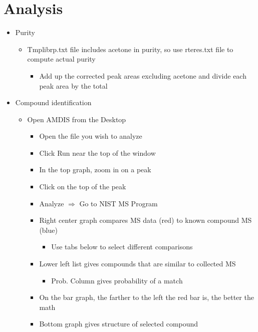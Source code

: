 \documentclass[letterpaper,11pt]{article}
\begin{document}
\section{Analysis}
	\begin{itemize}
	\item Purity
    	\begin{itemize}
    	\item Tmplibrp.txt file includes acetone in purity, so use rteres.txt file to compute actual purity
        	\begin{itemize}
        	\item Add up the corrected peak areas excluding acetone and divide each peak area by the total
        	\end{itemize}
    	\end{itemize}
    \item Compound identification
    	\begin{itemize}
    	\item Open AMDIS from the Desktop
        	\begin{itemize}
        	\item Open the file you wish to analyze
           	\item Click Run near the top of the window
            \item In the top graph, zoom in on a peak
            \item Click on the top of the peak
            \item Analyze $\Longrightarrow$ Go to NIST MS Program
            \item Right center graph compares MS data (red) to known compound MS (blue)
            	\begin{itemize}
            	\item Use tabs below to select different comparisons 
            	\end{itemize}
            \item Lower left list gives compounds that are similar to collected MS
            	\begin{itemize}
            	\item Prob. Column gives probability of a match
            	\end{itemize}
            \item On the bar graph, the farther to the left the red bar is, the better the math
            \item Bottom graph gives structure of selected compound
        	\end{itemize}
    	\end{itemize}
	\end{itemize}
\end{document}

